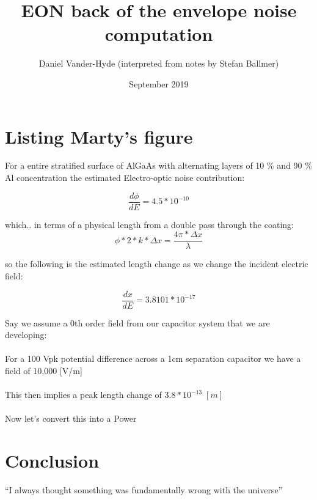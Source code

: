 \documentclass{article}
\title{EON back of the envelope noise computation}
\author{Daniel Vander-Hyde (interpreted from notes by Stefan Ballmer)}
\date{September 2019}
\begin{document}
\maketitle

\section{Listing Marty's figure}
For a entire stratified surface of AlGaAs with alternating layers of 10 \% and 90 \% Al concentration the estimated Electro-optic noise contribution:

$$ \frac{d \phi}{dE} = 4.5*10^{-10} $$

which.. in terms of a physical length from a double pass through the coating:
$$\phi *2*k*\Delta x = \frac{4 \pi* \Delta x}{\lambda}$$

so the following is the estimated length change as we change the incident electric field: 

$$ \frac{d x}{dE} =3.8101*10^{-17}$$

Say we assume a 0th order field from our capacitor system that we are developing:
\\
\\
For a 100 Vpk potential difference across a 1cm separation capacitor we have a field of 10,000 [V/m]
\\
\\ 
This then implies a peak length change of $3.8*10^{-13}\; [m]$
\\
\\ 
Now let's convert this into a Power
\section{Conclusion}
``I always thought something was fundamentally wrong with the universe'' \citep{adams1995hitchhiker}



\end{document}
